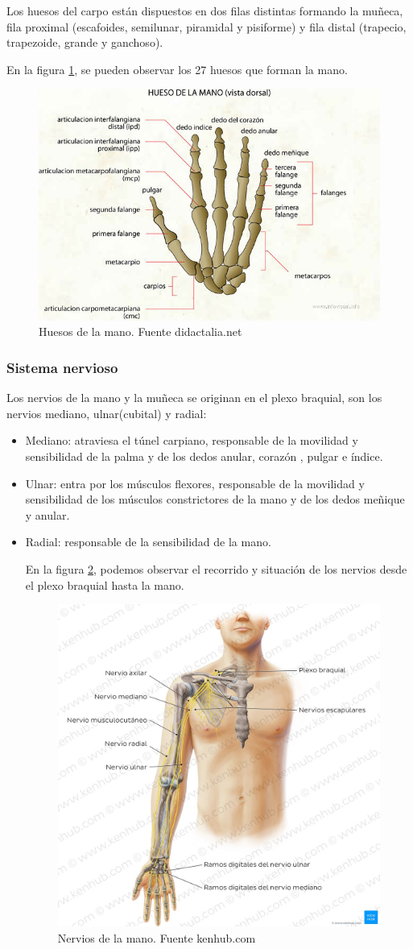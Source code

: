 Los huesos del carpo están dispuestos en dos filas distintas formando la muñeca, fila proximal (escafoides, semilunar, piramidal y pisiforme) y fila distal (trapecio, trapezoide, grande y ganchoso). \cite{mano_anatomía}

En la figura \ref{fig:Huesos_mano}, se pueden observar los 27 huesos que forman la mano.
\begin{figure}
    \centering
    \includegraphics[width=0.6\linewidth]{img/Huesos_mano.png}
    \caption{Huesos de la mano. Fuente didactalia.net}
    \label{fig:Huesos_mano}
\end{figure}
\subsubsection{Sistema nervioso}

Los nervios de la mano y la muñeca se originan en el plexo braquial, son los nervios mediano, ulnar(cubital) y radial:
\begin{itemize}
    \item Mediano: atraviesa el túnel carpiano, responsable de la movilidad y sensibilidad de la palma y de los dedos anular, corazón , pulgar e índice.
    \item Ulnar: entra por los músculos flexores, responsable de la movilidad y sensibilidad de los músculos constrictores de la mano y de los dedos meñique y anular.
    \item Radial: responsable de la sensibilidad de la mano.

\cite{mano_anatomía}

En la figura \ref{fig:nervios de la mano}, podemos observar el recorrido y situación de los nervios desde el plexo braquial hasta la mano.
\begin{figure}
    \centering
    \includegraphics[width=0.5\linewidth]{img/Mano_nervios.png}
    \caption{Nervios de la mano. Fuente kenhub.com}
    \label{fig:nervios de la mano}
\end{figure}
\end{itemize}
